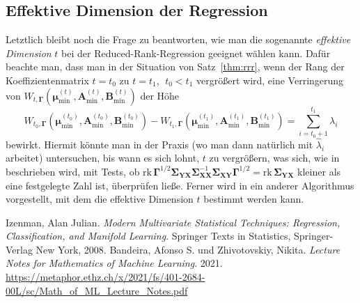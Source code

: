 \documentclass[]{article}
\newcommand{\X}{\mathbf{X}}
\newcommand{\Y}{\mathbf{Y}}
\newcommand{\muu}{\bm{\mu}}
\newcommand{\Ssigma}{\mathbf{\Sigma}}
\newcommand{\rk}{\mathrm{rk}}
\newcommand{\A}{\mathbf{A}}
\newcommand{\B}{\mathbf{B}}
\newcommand{\Ggamma}{\mathbf{\Gamma}}
\begin{document}
\subsection*{Effektive Dimension der Regression}
Letztlich bleibt noch die Frage zu beantworten, wie man die sogenannte \textit{effektive Dimension} $t$ bei der Reduced-Rank-Regression geeignet wählen kann. Dafür beachte man, dass man in der Situation von Satz~\ref{thm:rrr}, wenn der Rang der Koeffizientenmatrix $t = t_0$ zu $t = t_1$, $\; t_0 < t_1$ vergrößert wird, eine Verringerung von $W_{t, \Ggamma}(\muu^{(t)}_{\min}, \A^{(t)}_{\min}, \B^{(t)}_{\min})$ der Höhe
$$W_{t_0, \Ggamma}(\muu^{(t_0)}_{\min}, \A^{(t_0)}_{\min}, \B^{(t_0)}_{\min}) - W_{t_1, \Ggamma}(\muu^{(t_1)}_{\min}, \A^{(t_1)}_{\min}, \B^{(t_1)}_{\min}) = \sum_{i=t_0+1}^{t_1} \lambda_i$$
bewirkt. Hiermit könnte man in der Praxis (wo man dann natürlich mit $\widehat{\lambda}_i$ arbeitet) untersuchen, bis wann es sich \glqq lohnt\grqq , 
$t$ zu vergrößern, was sich, wie in \cite[Seite 185]{Iz08} beschrieben wird, mit Tests, ob $\rk \, \Ggamma^{1/2} \Ssigma_{\Y\X} \Ssigma_{\X\X}^{-1} \Ssigma_{\X\Y} \Ggamma^{1/2} = \rk \, \Ssigma_{\Y\X}$ kleiner als eine festgelegte Zahl ist, überprüfen ließe. Ferner wird in \cite[Kapitel 6.3.4]{Iz08} ein anderer Algorithmus vorgestellt, mit dem die effektive Dimension $t$ bestimmt werden kann.


\newpage

\begin{thebibliography}{9}
	Izenman, Alan Julian.
	\textit{Modern Multivariate Statistical Techniques: Regression, Classification, and Manifold Learning}. 
	Springer Texts in Statistics, Springer-Verlag New York, 2008.
	Bandeira, Afonso S. und Zhivotovskiy, Nikita.
	\textit{Lecture Notes for Mathematics of Machine Learning}. 2021.
	\url{https://metaphor.ethz.ch/x/2021/fs/401-2684-00L/sc/Math_of_ML_Lecture_Notes.pdf}
\end{thebibliography}
\end{document}
